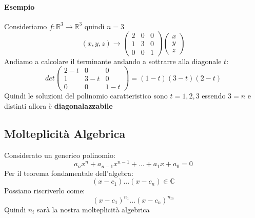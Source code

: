 \paragraph{Esempio}
Consideriamo $f: \mathbb{R}^3 \rightarrow \mathbb{R}^3$ quindi $n=3$
$$ (x,y,z) \rightarrow \begin{pmatrix}
2 & 0 & 0 \\ 1 & 3 & 0 \\ 0 & 0 & 1 
\end{pmatrix}
\begin{pmatrix}
x \\ y \\ z
\end{pmatrix} $$
Andiamo a calcolare il terminante andando a sottrarre alla diagonale $t$:
$$
det \begin{pmatrix}
2-t & 0 & 0 \\
1 & 3-t & 0 \\
0 & 0 & 1-t
\end{pmatrix}
= (1-t)(3-t)(2-t)
$$
Quindi le soluzioni del polinomio caratteristico sono $t=1,2,3$ essendo $3=n$ e distinti allora è \textbf{diagonalazzabile}

\subsection{Molteplicità Algebrica}
Considerato un generico polinomio:
$$ a_nx^n + a_{n-1}x^{n-1}+...+a_1x+a_0 = 0 $$
Per il teorema fondamentale dell'algebra:
$$ (x-c_1)...(x-c_n) \in \mathbb{C} $$
Possiano riscriverlo come:
$$ (x-c_1)^{n_1}...(x-c_n)^{n_m} $$
Quindi $n_i$ sarà la nostra molteplicità algebrica

